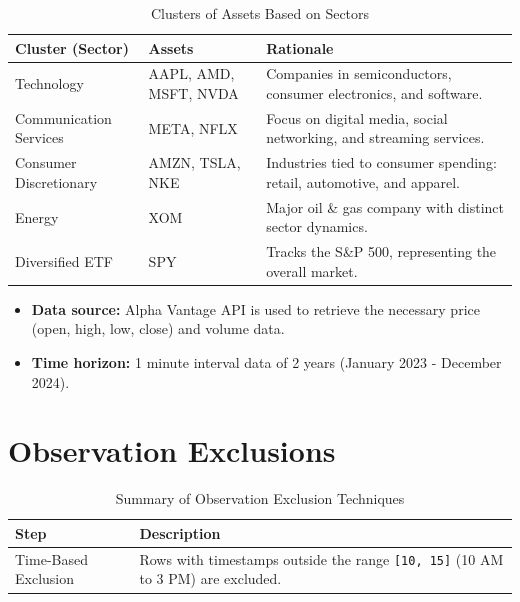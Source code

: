 \documentclass[11pt]{article}
\begin{document}
\begin{table}[h!]
    \centering
    \begin{tabular}{|l|l|p{5cm}|} %
        \hline
        \textbf{Cluster (Sector)} & \textbf{Assets} & \textbf{Rationale} \\ \hline
        Technology & AAPL, AMD, MSFT, NVDA & Companies in semiconductors, consumer electronics, and software. \\ \hline
        Communication Services & META, NFLX & Focus on digital media, social networking, and streaming services. \\ \hline
        Consumer Discretionary & AMZN, TSLA, NKE & Industries tied to consumer spending: retail, automotive, and apparel. \\ \hline
        Energy & XOM & Major oil \& gas company with distinct sector dynamics. \\ \hline
        Diversified ETF & SPY & Tracks the S\&P 500, representing the overall market. \\ \hline
    \end{tabular}
    \caption{Clusters of Assets Based on Sectors}
    \label{tab:clusters}
\end{table}

        

\begin{itemize} 
    \item \textbf{Data source:} Alpha Vantage API is used to retrieve the necessary price (open, high, low, close) and volume data.
    \item \textbf{Time horizon:} 1 minute interval data of 2 years (January 2023 - December 2024).
\end{itemize}

\section{Observation Exclusions}

\begin{table}[h!]
    \centering
    \caption{Summary of Observation Exclusion Techniques}
    \label{tab:observation_exclusion_technique}
    \begin{tabular}{|l|p{8cm}|}
        \hline
        \textbf{Step} & \textbf{Description} \\ \hline
        Time-Based Exclusion & Rows with timestamps outside the range \texttt{[10, 15]} (10 AM to 3 PM) are excluded. \\ \hline
    \end{tabular}
\end{table}
\end{document}
